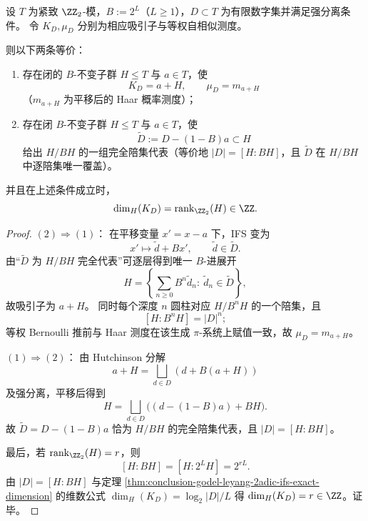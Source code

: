\begin{theorem}\label{thm:conclusion-2adic-selfsimilar-haar-rigidity-integer-dimension}
设 \(T\) 为紧致 \(\ZZ_2\)-模，\(B:=2^L\)（\(L\ge 1\)），\(D\subset T\) 为有限数字集并满足强分离条件。
令 \(K_D,\mu_D\) 分别为相应吸引子与等权自相似测度。

则以下两条等价：
\begin{enumerate}
  \item 存在闭的 \(B\)-不变子群 \(H\le T\) 与 \(a\in T\)，使
  \[
  K_D=a+H,\qquad \mu_D=m_{a+H}
  \]
  （\(m_{a+H}\) 为平移后的 Haar 概率测度）；
  \item 存在闭 \(B\)-不变子群 \(H\le T\) 与 \(a\in T\)，使
  \[
  \widetilde D:=D-(1-B)a\subset H
  \]
  给出 \(H/BH\) 的一组完全陪集代表（等价地 \(|D|=[H:BH]\)，且 \(\widetilde D\) 在 \(H/BH\) 中逐陪集唯一覆盖）。
\end{enumerate}
并且在上述条件成立时，
\[
\dim_H(K_D)=\operatorname{rank}_{\ZZ_2}(H)\in\ZZ.
\]
\end{theorem}
\begin{proof}
\((2)\Rightarrow(1)\)：
在平移变量 \(x'=x-a\) 下，IFS 变为
\[
x'\mapsto \widetilde d+Bx',\qquad \widetilde d\in\widetilde D.
\]
由“\(\widetilde D\) 为 \(H/BH\) 完全代表”可逐层得到唯一 \(B\)-进展开
\[
H=\left\{\sum_{n\ge 0}B^n\widetilde d_n:\ \widetilde d_n\in\widetilde D\right\},
\]
故吸引子为 \(a+H\)。
同时每个深度 \(n\) 圆柱对应 \(H/B^nH\) 的一个陪集，且
\[
[H:B^nH]=|D|^n;
\]
等权 Bernoulli 推前与 Haar 测度在该生成 \(\pi\)-系统上赋值一致，故 \(\mu_D=m_{a+H}\)。

\((1)\Rightarrow(2)\)：
由 Hutchinson 分解
\[
a+H=\bigsqcup_{d\in D}(d+B(a+H))
\]
及强分离，平移后得到
\[
H=\bigsqcup_{d\in D}\bigl((d-(1-B)a)+BH\bigr).
\]
故 \(\widetilde D=D-(1-B)a\) 恰为 \(H/BH\) 的完全陪集代表，且 \(|D|=[H:BH]\)。

最后，若 \(\operatorname{rank}_{\ZZ_2}(H)=r\)，则
\[
[H:BH]=[H:2^L H]=2^{rL}.
\]
由 \(|D|=[H:BH]\) 与定理 \ref{thm:conclusion-godel-leyang-2adic-ifs-exact-dimension} 的维数公式
\(
\dim_H(K_D)=\log_2|D|/L
\)
得 \(\dim_H(K_D)=r\in\ZZ\)。证毕。
\end{proof}

